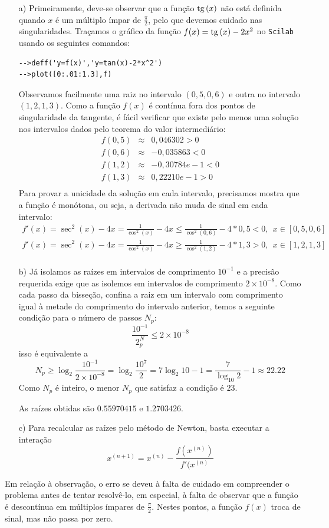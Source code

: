 \documentclass[main.tex]{subfiles}
\begin{document}
\begin{Answer}
  \begin{tiny}
    \begin{itemize}
\item[a)]Primeiramente, deve-se observar que a função $\operatorname{tg}\,(x)$ não está definida quando $x$ é um múltiplo ímpar de $\frac{\pi}{2}$, pelo que devemos cuidado nas singularidades. Traçamos o gráfico da função $f(x)=\operatorname{tg}\,(x)-2x^2$ no \verb+Scilab+ usando os seguintes comandos:
\begin{verbatim}
-->deff('y=f(x)','y=tan(x)-2*x^2')
-->plot([0:.01:1.3],f)
\end{verbatim} 
Observamos facilmente uma raiz no intervalo $(0,5, 0,6)$ e outra no intervalo $(1,2, 1,3)$. Como a função $f(x)$ é contínua fora dos pontos de singularidade da tangente, é fácil verificar que existe pelo menos uma solução nos intervalos dados pelo teorema do valor intermediário:
\begin{eqnarray*}
f(0,5) &\approx& 0,046302 >0\\
f(0,6) &\approx& -0,035863 <0\\
f(1,2) &\approx& -0,30784e-1 <0\\
f(1,3) &\approx&  0,22210e-1>0\\
\end{eqnarray*} 
Para provar a unicidade da solução em cada intervalo, precisamos mostra que a função é monótona, ou seja, a derivada não muda de sinal em cada intervalo:
\begin{eqnarray*}
f'(x)=\sec^2(x)-4x=\frac{1}{\cos^2(x)}-4x\leq \frac{1}{\cos^2(0,6)}-4*0,5<0, ~~x\in[ 0,5, 0,6]\\
f'(x)=\sec^2(x)-4x=\frac{1}{\cos^2(x)}-4x\geq \frac{1}{\cos^2(1,2)}-4*1,3>0, ~~x\in[ 1,2, 1,3]\\
\end{eqnarray*} 

\item[b)] 
Já isolamos as raízes em intervalos de comprimento $10^{-1}$ e a precisão requerida exige que as isolemos em intervalos de comprimento $2\times 10^{-8}$. Como cada passo da bisseção, confina a raiz em um intervalo com comprimento igual à metade do comprimento do intervalo anterior, temos a seguinte condição para o número de passos $N_p$:
$$\frac{10^{-1}}{2^N_p}\leq 2\times 10^{-8}$$
isso é equivalente a
$$N_p\geq \log_2 \frac{10^{-1}}{2\times 10^{-8}}=\log_2 \frac{10^{7}}{2}=7\log_2 10 -1=\frac{7}{\log_10 2}-1\approx 22.22$$
Como $N_p$ é inteiro, o menor $N_p$ que satisfaz a condição é $23$.

As raízes obtidas são $0.55970415$ e $1.2703426$. 

\item[c)] Para recalcular as raízes pelo método de Newton, basta executar a interação
$$x^{(n+1)}=x^{(n)}-\frac{f(x^{(n)})}{f'(x^{(n)}}$$    
\end{itemize}
Em relação à observação, o erro se deveu à falta de cuidado em compreender o problema antes de tentar resolvê-lo, em especial, à falta de observar que a função é descontínua em  múltiplos ímpares de $\frac{\pi}{2}$. Nestes pontos, a função $f(x)$ troca de sinal, mas não passa por zero.    
  \end{tiny}
\end{Answer}
\fi
\end{document}
